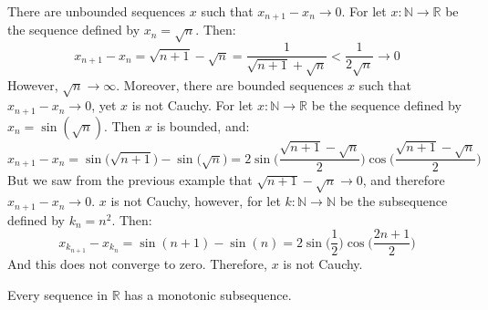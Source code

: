 \documentclass[crop=false,class=book,oneside]{standalone}
\begin{document}
            \begin{example}
                There are unbounded sequences $x$ such that
                $x_{n+1}-x_{n}\rightarrow{0}$. For let
                $x:\mathbb{N}\rightarrow\mathbb{R}$
                be the sequence defined
                by $x_{n}=\sqrt{n}$. Then:
                \begin{equation*}
                    x_{n+1}-x_{n}=\sqrt{n+1}-\sqrt{n}
                    =\frac{1}{\sqrt{n+1}+\sqrt{n}}
                    <\frac{1}{2\sqrt{n}}
                    \rightarrow{0}
                \end{equation*}
                However, $\sqrt{n}\rightarrow\infty$.
                Moreover, there are bounded sequences $x$
                such that $x_{n+1}-x_{n}\rightarrow{0}$,
                yet $x$ is not Cauchy. For let
                $x:\mathbb{N}\rightarrow\mathbb{R}$
                be the sequence defined by
                $x_{n}=\sin(\sqrt{n})$.
                Then $x$ is bounded, and:
                \begin{equation*}
                    x_{n+1}-x_{n}=
                    \sin\big(\sqrt{n+1})-\sin(\sqrt{n}\big)=
                    2\sin\Big(\frac{\sqrt{n+1}-\sqrt{n}}{2}\Big)
                    \cos\Big(\frac{\sqrt{n+1}-\sqrt{n}}{2}\Big)
                \end{equation*}
                But we saw from the previous example that
                $\sqrt{n+1}-\sqrt{n}\rightarrow{0}$, and
                therefore $x_{n+1}-x_{n}\rightarrow{0}$.
                $x$ is not Cauchy, however, for let
                $k:\mathbb{N}\rightarrow\mathbb{N}$ be
                the subsequence defined by $k_{n}=n^{2}$. Then:
                \begin{equation*}
                    x_{k_{n+1}}-x_{k_{n}}
                    =\sin(n+1)-\sin(n)
                    =2\sin\Big(\frac{1}{2}\Big)
                    \cos\Big(\frac{2n+1}{2}\Big)
                \end{equation*}
                And this does not converge to zero.
                Therefore, $x$ is not Cauchy.
            \end{example}
            \begin{theorem}
                \label{th:funct:sequences_have_%
                       monotonic_subsequence}
                Every sequence in $\mathbb{R}$
                has a monotonic subsequence.
            \end{theorem}
\end{document}
